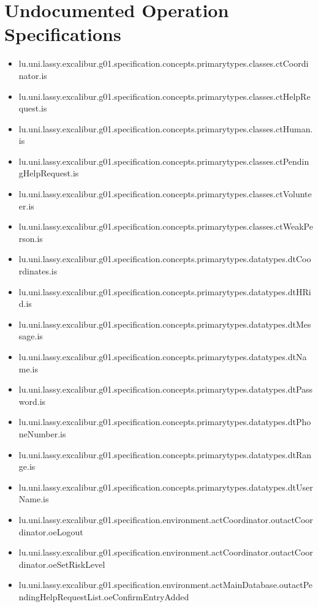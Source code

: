 \section[Undocumented Operation Specifications]{Undocumented Operation Specifications}
\begin{itemize}
\item lu.uni.lassy.excalibur.g01.specification.concepts.primarytypes.classes.ctCoordinator.is 
\item lu.uni.lassy.excalibur.g01.specification.concepts.primarytypes.classes.ctHelpRequest.is 
\item lu.uni.lassy.excalibur.g01.specification.concepts.primarytypes.classes.ctHuman.is 
\item lu.uni.lassy.excalibur.g01.specification.concepts.primarytypes.classes.ctPendingHelpRequest.is 
\item lu.uni.lassy.excalibur.g01.specification.concepts.primarytypes.classes.ctVolunteer.is 
\item lu.uni.lassy.excalibur.g01.specification.concepts.primarytypes.classes.ctWeakPerson.is 
\item lu.uni.lassy.excalibur.g01.specification.concepts.primarytypes.datatypes.dtCoordinates.is 
\item lu.uni.lassy.excalibur.g01.specification.concepts.primarytypes.datatypes.dtHRid.is 
\item lu.uni.lassy.excalibur.g01.specification.concepts.primarytypes.datatypes.dtMessage.is 
\item lu.uni.lassy.excalibur.g01.specification.concepts.primarytypes.datatypes.dtName.is 
\item lu.uni.lassy.excalibur.g01.specification.concepts.primarytypes.datatypes.dtPassword.is 
\item lu.uni.lassy.excalibur.g01.specification.concepts.primarytypes.datatypes.dtPhoneNumber.is 
\item lu.uni.lassy.excalibur.g01.specification.concepts.primarytypes.datatypes.dtRange.is 
\item lu.uni.lassy.excalibur.g01.specification.concepts.primarytypes.datatypes.dtUserName.is 
\item lu.uni.lassy.excalibur.g01.specification.environment.actCoordinator.outactCoordinator.oeLogout 
\item lu.uni.lassy.excalibur.g01.specification.environment.actCoordinator.outactCoordinator.oeSetRiskLevel 
\item lu.uni.lassy.excalibur.g01.specification.environment.actMainDatabase.outactPendingHelpRequestList.oeConfirmEntryAdded 

\end{itemize}
